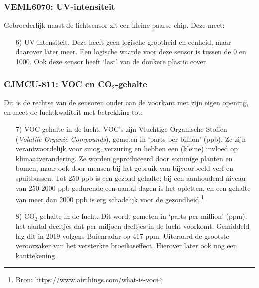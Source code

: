 \documentclass[a4paper,11pt, fleqn]{article}
\begin{document}
\subsubsection{VEML6070: UV-intensiteit}
Gebroederlijk naast de lichtsensor zit een kleine paarse chip. Deze meet:
\begin{itemize}
	\item[6)] UV-intensiteit. Deze heeft geen logische grootheid en eenheid, maar daarover later meer. Een logische waarde voor deze sensor is tussen de 0 en 1000. Ook deze sensor heeft `last' van de donkere plastic cover.
\end{itemize}

\subsubsection{CJMCU-811: VOC en CO$_2$-gehalte}
Dit is de rechtse van de sensoren onder aan de voorkant met zijn eigen opening, en meet de luchtkwaliteit met betrekking tot:
\begin{itemize}
	\item[7)] VOC-gehalte in de lucht. VOC's zijn Vluchtige Organische Stoffen ({\it Volatile Organic Compounds}), gemeten in `parts per billion' (ppb). Ze zijn verantwoordelijk voor smog, verzuring en hebben een (kleine) invloed op klimaatverandering. Ze worden geproduceerd door sommige planten en bomen, maar ook door mensen bij het gebruik van bijvoorbeeld verf en spuitbussen. Tot 250 ppb is een gezond gehalte; bij een aanhoudend niveau van 250-2000 ppb gedurende een aantal dagen is het opletten, en een gehalte van meer dan 2000 ppb is erg schadelijk voor de gezondheid.\footnote{Bron: \href{https://www.airthings.com/what-is-voc}{https://www.airthings.com/what-is-voc}}
	\item[8)] CO$_2$-gehalte in de lucht. Dit wordt gemeten in `parts per million' (ppm): het aantal deeltjes dat per miljoen deeltjes in de lucht voorkomt. Gemiddeld lag dit in 2019 volgens Buienradar op 417 ppm. Uiteraard de grootste veroorzaker van het versterkte broeikaseffect. Hierover later ook nog een kanttekening.
\end{itemize}
\end{document}
